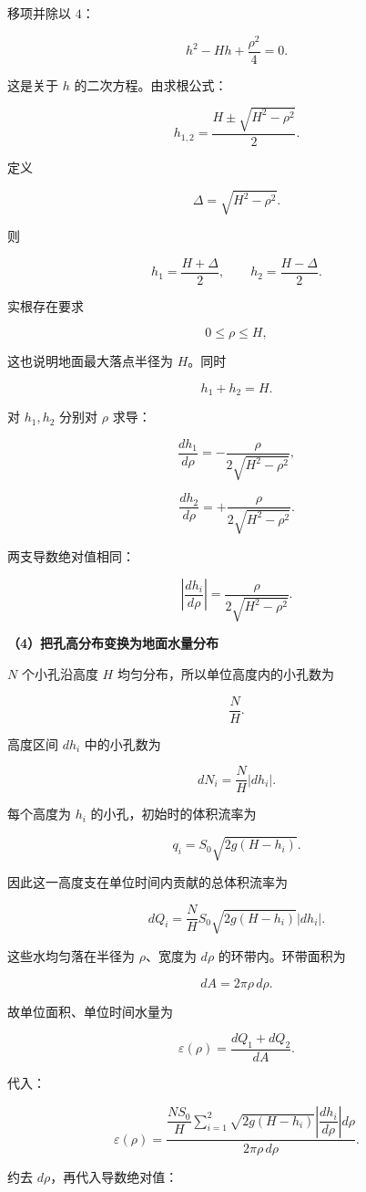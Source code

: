 \documentclass[12pt,a4paper,UTF8]{ctexart}
\begin{document}
移项并除以 \(4\)：

\[h^2-Hh+\frac{\rho^2}{4}=0.\]

这是关于 \(h\) 的二次方程。由求根公式：

\[h_{1,2}
=\frac{H\pm\sqrt{H^2-\rho^2}}{2}.\]

定义

\[\Delta=\sqrt{H^2-\rho^2}.\]

则

\[h_1=\frac{H+\Delta}{2},\qquad
h_2=\frac{H-\Delta}{2}.\]

实根存在要求

\[0\leq\rho\leq H,\]

这也说明地面最大落点半径为 \(H\)。同时

\[h_1+h_2=H.\]

对 \(h_1,h_2\) 分别对 \(\rho\) 求导：

\[\frac{dh_1}{d\rho}
=-\frac{\rho}{2\sqrt{H^2-\rho^2}},\]

\[\frac{dh_2}{d\rho}
=+\frac{\rho}{2\sqrt{H^2-\rho^2}}.\]

两支导数绝对值相同：

\[\left|\frac{dh_i}{d\rho}\right|
=\frac{\rho}{2\sqrt{H^2-\rho^2}}.\]

\textbf{（4）把孔高分布变换为地面水量分布}

\(N\) 个小孔沿高度 \(H\) 均匀分布，所以单位高度内的小孔数为

\[\frac NH.\]

高度区间 \(dh_i\) 中的小孔数为

\[dN_i=\frac NH|dh_i|.\]

每个高度为 \(h_i\) 的小孔，初始时的体积流率为

\[q_i=S_0\sqrt{2g(H-h_i)}.\]

因此这一高度支在单位时间内贡献的总体积流率为

\[dQ_i
=\frac NH
S_0\sqrt{2g(H-h_i)}
|dh_i|.\]

这些水均匀落在半径为 \(\rho\)、宽度为 \(d\rho\) 的环带内。环带面积为

\[dA=2\pi\rho\,d\rho.\]

故单位面积、单位时间水量为

\[\varepsilon(\rho)
=\frac{dQ_1+dQ_2}{dA}.\]

代入：

\[\varepsilon(\rho)
=\frac{
\dfrac{NS_0}{H}
\sum_{i=1}^{2}
\sqrt{2g(H-h_i)}
\left|\dfrac{dh_i}{d\rho}\right|d\rho
}{
2\pi\rho\,d\rho
}.\]

约去 \(d\rho\)，再代入导数绝对值：
\end{document}
